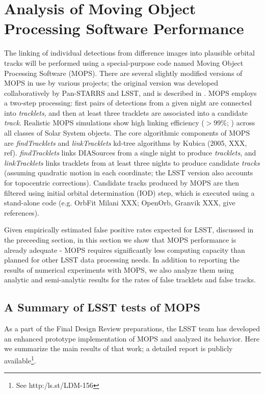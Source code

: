 
\section{Analysis of Moving Object Processing Software Performance \label{sec:mops}}


The linking of individual detections from difference images into plausible orbital tracks will be performed using
a special-purpose code named Moving Object Processing Software (MOPS). There are several slightly modified
versions of MOPS in use by various projects; the original version was developed collaboratively by Pan-STARRS
and LSST, and is described in \cite{denneau13}. MOPS employs a two-step processing: first pairs of detections
from a given night are connected into {\it tracklets}, and then at least three tracklets are associated into a
candidate {\it track}. Realistic MOPS simulations show high linking efficiency ($>$99\%; \citealt{denneau13})
across all classes of Solar System objects. The core algorithmic components of MOPS are {\it findTracklets} and
{\it linkTracklets} kd-tree algorithms by Kubica (2005, XXX, ref). {\it findTracklets} links DIASources from a single
night to produce {\it tracklets}, and {\it linkTracklets} links tracklets from at least three nights to produce candidate
{\it tracks} (assuming quadratic motion in each coordinate; the LSST version also accounts for topocentric
corrections). Candidate tracks produced by MOPS are then filtered using initial orbital determination (IOD) step,
which is executed using a stand-alone code (e.g. OrbFit Milani XXX; OpenOrb, Granvik XXX, give references).

Given empirically estimated false positive rates expected for LSST, discussed in the preceeding section,
in this section we show that MOPS performance is already adequate - MOPS requires significantly less
computing capacity than planned for other LSST data processing needs. In addition to reporting the results of
numerical experiments with MOPS, we also analyze them using analytic and semi-analytic results for the
rates of false tracklets and false tracks.




\subsection{A Summary of LSST tests of MOPS}

As a part of the Final Design Review preparations, the LSST team has developed an enhanced prototype
implementation of MOPS and analyzed its behavior. Here we summarize the main results of that work;
a detailed report is publicly available\footnote{See http:/ls.st/LDM-156}.

